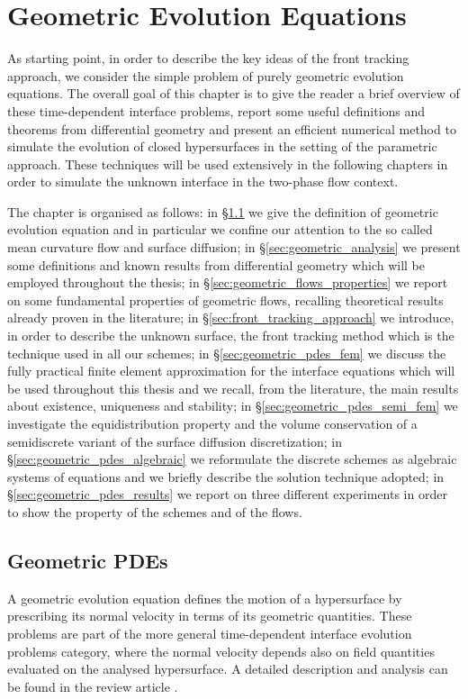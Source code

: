 \chapter{\sc Geometric Evolution Equations}\label{ch:geometric_pdes}
As starting point, in order to describe the key ideas of the front tracking
approach, we consider the simple problem of purely geometric evolution
equations. The overall goal of this chapter is to give the reader a brief
overview of these time-dependent interface problems, report some useful
definitions and theorems from differential geometry and present an efficient
numerical method to simulate the evolution of closed hypersurfaces in the
setting of the parametric approach. These techniques will be used extensively
in the following chapters in order to simulate the unknown interface in the
two-phase flow context.

The chapter is organised as follows: in \S\ref{sec:geometric_pdes} we
give the definition of geometric evolution equation and in particular we
confine our attention to the so called mean curvature flow and surface
diffusion; in \S\ref{sec:geometric_analysis} we present some definitions
and known results from differential geometry which will be employed throughout
the thesis; in \S\ref{sec:geometric_flows_properties} we report on some
fundamental properties of geometric flows, recalling theoretical results already
proven in the literature; in \S\ref{sec:front_tracking_approach} we
introduce, in order to describe the unknown surface, the front tracking method
which is the technique used in all our schemes; in
\S\ref{sec:geometric_pdes_fem} we discuss the fully practical finite
element approximation for the interface equations which will be used throughout
this thesis and we recall, from the literature, the main results about
existence, uniqueness and stability; in \S\ref{sec:geometric_pdes_semi_fem} we
investigate the equidistribution property and the volume conservation of a
semidiscrete variant of the surface diffusion discretization; in
\S\ref{sec:geometric_pdes_algebraic} we reformulate the discrete schemes
as algebraic systems of equations and we briefly describe the solution technique
adopted; in \S\ref{sec:geometric_pdes_results} we report on three different
experiments in order to show the property of the schemes and of the flows.

\section{Geometric PDEs}\label{sec:geometric_pdes}
A geometric evolution equation defines the motion of a hypersurface
by prescribing its normal velocity in terms of its geometric quantities. These
problems are part of the more general time-dependent interface evolution
problems category, where the normal velocity depends also on field quantities
evaluated on the analysed hypersurface. A detailed description and analysis can
be found in the review article \cite{DeckelnickDE05}.

